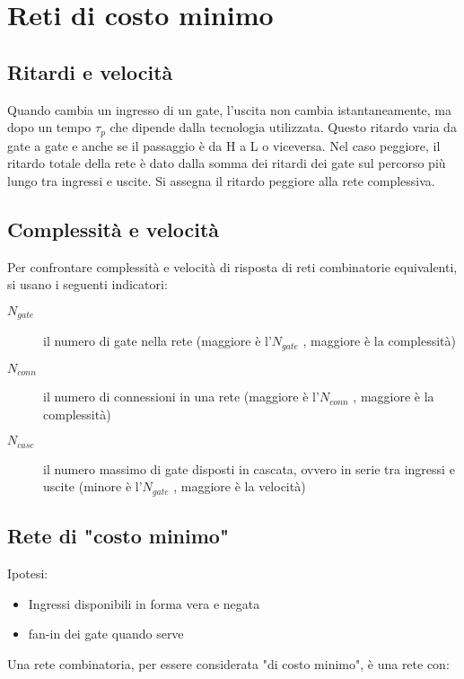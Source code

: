\documentclass{article}
\begin{document}
\section{Reti di costo minimo}

\subsection{Ritardi e velocità}

Quando cambia un ingresso di un gate, l’uscita non cambia istantaneamente, ma dopo un tempo $\tau_p$ che dipende dalla tecnologia utilizzata.
Questo ritardo varia da gate a gate e anche se il passaggio è da H a L o viceversa.
Nel caso peggiore, il ritardo totale della rete è dato dalla somma dei ritardi dei gate sul percorso più lungo tra ingressi e uscite.
Si assegna il ritardo peggiore alla rete complessiva.

\subsection{Complessità e velocità}

Per confrontare complessità e velocità di risposta di reti combinatorie equivalenti, si usano i seguenti indicatori:

\begin{description}
    \item[$N_{gate}$] il numero di gate nella rete (maggiore è l'$N_{gate}$ , maggiore è la complessità)
    \item[$N_{conn}$] il numero di connessioni in una rete (maggiore è l'$N_{conn}$ , maggiore è la complessità)
    \item[$N_{casc}$] il numero massimo di gate disposti in cascata, ovvero in serie tra ingressi e uscite (minore è l'$N_{gate}$ , maggiore è la velocità)
\end{description}

\subsection{Rete di "costo minimo"}

Ipotesi:

\begin{itemize}
    \item Ingressi disponibili in forma vera e negata
    \item fan-in dei gate quando serve
\end{itemize}

\noindent
Una rete combinatoria, per essere considerata "di costo minimo", è una rete con:
\end{document}
